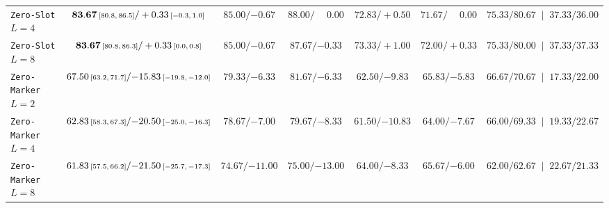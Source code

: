 \begin{table}[t]
{\begin{tabular}{l c c c c c c}
    \rowcolor{resulttint}
    \texttt{Zero-Slot} $L=4$ & $\mathbf{83.67}\ci{80.8}{86.5} / +0.33\ci{-0.3}{1.0}$ & $85.00 / {-0.67}$ & $88.00 / \phantom{+}0.00$ & $72.83 / +0.50$ & $71.67 / \phantom{+}0.00$ & $75.33 / 80.67 \;\;|\;\; 37.33 / 36.00$ \\
    \rowcolor{resulttint}
    \texttt{Zero-Slot} $L=8$ & $\mathbf{83.67}\ci{80.8}{86.3} / +0.33\ci{0.0}{0.8}$ & $85.00 / {-0.67}$ & $87.67 / {-0.33}$ & $73.33 / +1.00$ & $72.00 / +0.33$ & $75.33 / 80.00 \;\;|\;\; 37.33 / 37.33$ \\
    \texttt{Zero-Marker} $L=2$ & $67.50\ci{63.2}{71.7} / {-15.83}\ci{-19.8}{-12.0}$ & $79.33 / {-6.33}$ & $81.67 / {-6.33}$ & $62.50 / {-9.83}$ & $65.83 / {-5.83}$ & $66.67 / 70.67 \;\;|\;\; 17.33 / 22.00$ \\
    \texttt{Zero-Marker} $L=4$ & $62.83\ci{58.3}{67.3} / {-20.50}\ci{-25.0}{-16.3}$ & $78.67 / {-7.00}$ & $79.67 / {-8.33}$ & $61.50 / {-10.83}$ & $64.00 / {-7.67}$ & $66.00 / 69.33 \;\;|\;\; 19.33 / 22.67$ \\
    \texttt{Zero-Marker} $L=8$ & $61.83\ci{57.5}{66.2} / {-21.50}\ci{-25.7}{-17.3}$ & $74.67 / {-11.00}$ & $75.00 / {-13.00}$ & $64.00 / {-8.33}$ & $65.67 / {-6.00}$ & $62.00 / 62.67 \;\;|\;\; 22.67 / 21.33$ \\
    \bottomrule
  \end{tabular}%
  }
\end{table}

